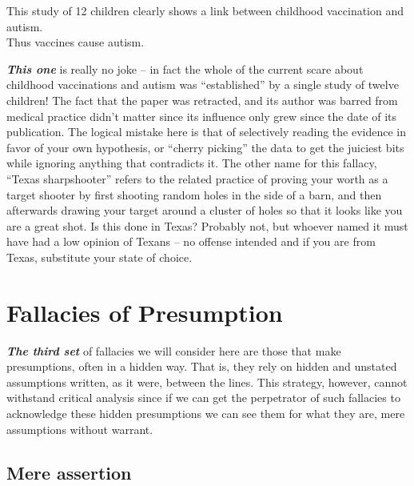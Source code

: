\documentclass[12pt, openany]{book}
\begin{document}
\begin{center}

\begin{argument}

This study of 12 children clearly shows a link between childhood vaccination and autism.\\

Thus vaccines cause autism.

\end{argument}

\end{center}

\textbf{\emph{This one}} is really no joke -- in fact the whole of the current scare about childhood vaccinations and autism was ``established'' by a single study of twelve children! The fact that the paper was retracted, and its author was barred from medical practice didn't matter since its influence only grew since the date of its publication. The logical mistake here is that of selectively reading the evidence in favor of your own hypothesis, or ``cherry picking'' the data to get the juiciest bits while ignoring anything that contradicts it. The other name for this fallacy, ``Texas sharpshooter'' refers to the related practice of proving your worth as a target shooter by first shooting random holes in the side of a barn, and then afterwards drawing your target around a cluster of holes so that it looks like you are a great shot. Is this done in Texas? Probably not, but whoever named it must have had a low opinion of Texans -- no offense intended and if you are from Texas, substitute your state of choice.

\hypertarget{presumption}{%
\section{Fallacies of Presumption}\label{presumption}}

\textbf{\emph{The third set}} of fallacies we will consider here are those that make presumptions, often in a hidden way. That is, they rely on hidden and unstated assumptions written, as it were, between the lines. This strategy, however, cannot withstand critical analysis since if we can get the perpetrator of such fallacies to acknowledge these hidden presumptions we can see them for what they are, mere assumptions without warrant.

\hypertarget{mere-assertion}{%
\subsection*{Mere assertion}\label{mere-assertion}}
\end{document}

